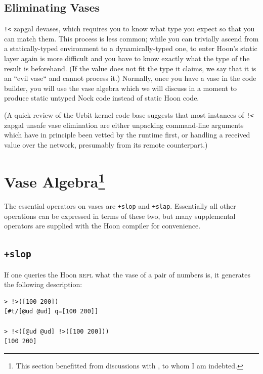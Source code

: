 \documentclass[twoside]{article}
\begin{document}
\subsection{Eliminating Vases}

\lstinline[style=inlinecode]{!<} zapgal devases, which requires you to know what type you expect so that you can match them.  This process is less common; while you can trivially ascend from a statically-typed environment to a dynamically-typed one, to enter Hoon's static layer again is more difficult and you have to know exactly what the type of the result is beforehand.  (If the value does not fit the type it claims, we say that it is an “evil vase“ and cannot process it.)  Normally, once you have a vase in the code builder, you will use the vase algebra which we will discuss in a moment to produce static untyped Nock code instead of static Hoon code.

(A quick review of the Urbit kernel code base suggests that most instances of \lstinline[style=inlinecode]{!<} zapgal unsafe vase elimination are either unpacking command-line arguments which have in principle been vetted by the runtime first, or handling a received value over the network, presumably from its remote counterpart.)

\section[Vase Algebra]{Vase Algebra\footnote{This section benefitted from discussions with , to whom I am indebted.}}

The essential operators on vases are \lstinline[style=inlinecode]{+slop} and \lstinline[style=inlinecode]{+slap}.  Essentially all other operations can be expressed in terms of these two, but many supplemental operators are supplied with the Hoon compiler for convenience.

\subsection{\lstinline[style=inlinecode]{+slop}}

If one queries the Hoon \textsc{repl} what the vase of a pair of numbers is, it generates the following description:

\begin{lstlisting}[style=listingcode]
> !>([100 200])
[#t/[@ud @ud] q=[100 200]]

> !<([@ud @ud] !>([100 200]))
[100 200]
\end{lstlisting}
\end{document}
